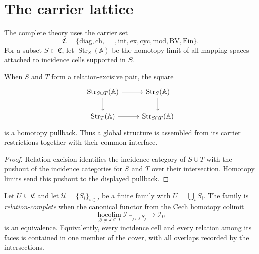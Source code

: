\chapter{The carrier lattice}
The complete theory uses the carrier set
\[
 \mathfrak C=
 \{\mathrm{diag},\mathrm{ch},\perp,\mathrm{int},
   \mathrm{ex},\mathrm{cyc},\mathrm{mod},\mathrm{BV},\mathrm{Ein}\}.
\]
For a subset $S\subset\mathfrak C$, let $\operatorname{Str}_S(\mathbb A)$ be the homotopy limit of all mapping spaces attached to incidence cells supported in $S$.

\begin{theorem}
When $S$ and $T$ form a relation-excisive pair, the square
\[
\begin{tikzcd}
\operatorname{Str}_{S\cup T}(\mathbb A)\arrow[r]\arrow[d]&
\operatorname{Str}_S(\mathbb A)\arrow[d]\\
\operatorname{Str}_T(\mathbb A)\arrow[r]&
\operatorname{Str}_{S\cap T}(\mathbb A)
\end{tikzcd}
\]
is a homotopy pullback.  Thus a global structure is assembled from its carrier restrictions together with their common interface.
\end{theorem}
\begin{proof}
Relation-excision identifies the incidence category of $S\cup T$ with the pushout of the incidence categories for $S$ and $T$ over their intersection.  Homotopy limits send this pushout to the displayed pullback.
\end{proof}

\begin{definition}
Let $U\subseteq\mathfrak C$ and let $\mathcal U=\{S_i\}_{i\in I}$ be a finite family with $U=\bigcup_iS_i$.  The family is \emph{relation-complete} when the canonical functor from the Cech homotopy colimit
\[
 \underset{\varnothing\ne J\subseteq I}{\operatorname{hocolim}}
 \mathcal I_{\cap_{j\in J}S_j}
 \longrightarrow \mathcal I_U
\]
is an equivalence.  Equivalently, every incidence cell and every relation among its faces is contained in one member of the cover, with all overlaps recorded by the intersections.
\end{definition}

